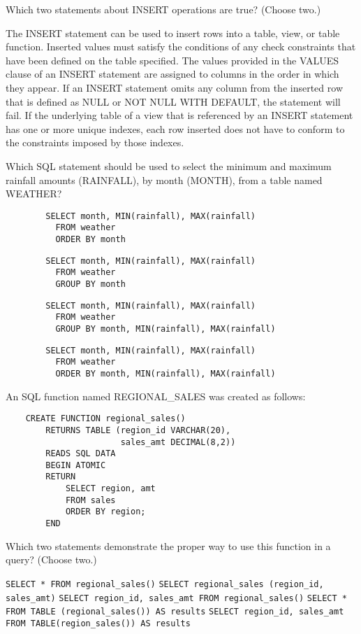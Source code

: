 \documentclass[11pt]{exam}
\begin{document}
\begin{questions}
\question[1]
Which two statements about INSERT operations are true? (Choose two.)
\begin{choices}
\choice The INSERT statement can be used to insert rows into a table, view, or table function.
\choice Inserted values must satisfy the conditions of any check constraints that have been defined on the
table specified.
\choice The values provided in the VALUES clause of an INSERT statement are assigned to columns in the 
order in which they appear.
\choice If an INSERT statement omits any column from the inserted row that is defined as NULL or NOT
NULL WITH DEFAULT, the statement will fail.
\choice If the underlying table of a view that is referenced by an INSERT statement has one or more
unique indexes, each row inserted does not have to conform to the constraints imposed by those indexes.
\end{choices}

\question[1]
Which SQL statement should be used to select the minimum and maximum rainfall amounts (RAINFALL), by 
month (MONTH), from a table named WEATHER?
\begin{choices}
\choice \begin{verbatim}
		SELECT month, MIN(rainfall), MAX(rainfall)
		  FROM weather
		  ORDER BY month
		\end{verbatim}
\choice \begin{verbatim}
		SELECT month, MIN(rainfall), MAX(rainfall)
		  FROM weather
		  GROUP BY month
		\end{verbatim}
\choice \begin{verbatim}
		SELECT month, MIN(rainfall), MAX(rainfall)
		  FROM weather
		  GROUP BY month, MIN(rainfall), MAX(rainfall)
		\end{verbatim}
\choice \begin{verbatim}
		SELECT month, MIN(rainfall), MAX(rainfall)
		  FROM weather
		  ORDER BY month, MIN(rainfall), MAX(rainfall)
		\end{verbatim}
\end{choices}

\newpage
\question[1]
An SQL function named REGIONAL\_SALES was created as follows:
	\begin{verbatim}
	CREATE FUNCTION regional_sales()
		RETURNS TABLE (region_id VARCHAR(20),
					   sales_amt DECIMAL(8,2))
		READS SQL DATA
		BEGIN ATOMIC
		RETURN
			SELECT region, amt
			FROM sales
			ORDER BY region;
		END
	\end{verbatim}
Which two statements demonstrate the proper way to use this function in a query? (Choose two.)
\begin{choices}
\choice \texttt{SELECT * FROM regional\_sales()}
\choice \texttt{SELECT regional\_sales (region\_id, sales\_amt)}
\choice \texttt{SELECT region\_id, sales\_amt FROM regional\_sales()}
\choice \texttt{SELECT * FROM TABLE (regional\_sales()) AS results}
\choice \texttt{SELECT region\_id, sales\_amt FROM TABLE(region\_sales()) AS results}
\end{choices}


\end{questions}
\end{document}

